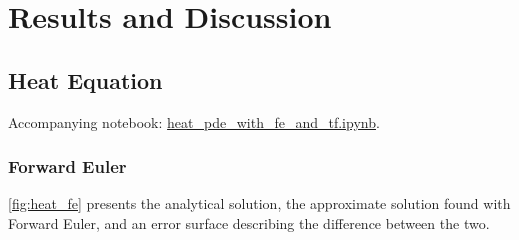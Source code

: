 \section{Results and Discussion}\label{sec:Results}

\subsection{Heat Equation}\label{sec:heateq results}
Accompanying notebook: \href{https://github.com/nicolossus/FYS-STK4155-Project3/blob/master/notebooks/heat_pde_with_fe_and_tf.ipynb}{heat\_pde\_with\_fe\_and\_tf.ipynb}.

\subsubsection{Forward Euler}

\autoref{fig:heat_fe} presents the analytical solution, the approximate solution found with Forward Euler, and an error surface describing the difference between the two.

